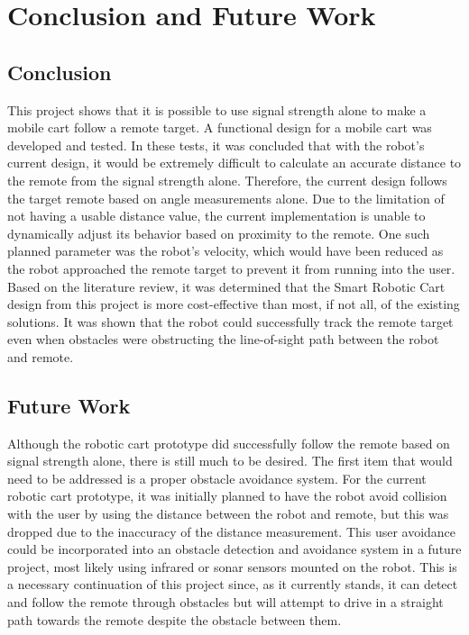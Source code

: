\chapter{Conclusion and Future Work}
\label{ch: Chapter6}
\label{ch: conclusionAndFuture}

\section{Conclusion}

This project shows that it is possible to use signal strength alone to make a mobile cart follow a remote target. A functional design for a mobile cart was developed and tested. In these tests, it was concluded that with the robot's current design, it would be extremely difficult to calculate an accurate distance to the remote from the signal strength alone. Therefore, the current design follows the target remote based on angle measurements alone. Due to the limitation of not having a usable distance value, the current implementation is unable to dynamically adjust its behavior based on proximity to the remote. One such planned parameter was the robot's velocity, which would have been reduced as the robot approached the remote target to prevent it from running into the user. Based on the literature review, it was determined that the Smart Robotic Cart design from this project is more cost-effective than most, if not all, of the existing solutions. It was shown that the robot could successfully track the remote target even when obstacles were obstructing the line-of-sight path between the robot and remote.

\section{Future Work}

Although the robotic cart prototype did successfully follow the remote based on signal strength alone, there is still much to be desired. The first item that would need to be addressed is a proper obstacle avoidance system. For the current robotic cart prototype, it was initially planned to have the robot avoid collision with the user by using the distance between the robot and remote, but this was dropped due to the inaccuracy of the distance measurement. This user avoidance could be incorporated into an obstacle detection and avoidance system in a future project, most likely using infrared or sonar sensors mounted on the robot. This is a necessary continuation of this project since, as it currently stands, it can detect and follow the remote through obstacles but will attempt to drive in a straight path towards the remote despite the obstacle between them.

